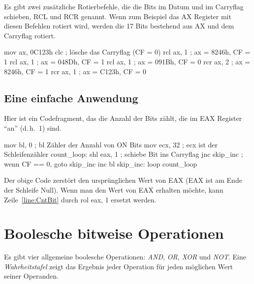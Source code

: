 Es gibt zwei zus\"{a}tzliche Rotierbefehle, die die Bits im Datum und im
Carryflag schieben, {\code RCL}  und
{\code RCR}  genannt. Wenn zum Beispiel
das {\code AX} Register mit diesen Befehlen rotiert wird, werden die
17 Bits bestehend aus {\code AX} und dem Carryflag rotiert.
\begin{AsmCodeListing}[frame=none, numbers=left, firstnumber=last, commandchars=\\\{\}]
      mov    ax, 0C123h
      clc                     ; l\"{o}sche das Carryflag (CF = 0)
      rcl    ax, 1            ; ax = 8246h, CF = 1
      rcl    ax, 1            ; ax = 048Dh, CF = 1
      rcl    ax, 1            ; ax = 091Bh, CF = 0
      rcr    ax, 2            ; ax = 8246h, CF = 1
      rcr    ax, 1            ; ax = C123h, CF = 0
\end{AsmCodeListing}

\subsection{Eine einfache Anwendung\label{sec:AddBitsExample}}

Hier ist ein Codefragment, das die Anzahl der Bits z\"{a}hlt, die im EAX
Register "`an"' (d.\,h.~1) sind.
\begin{AsmCodeListing}[numbers=left, commandchars=\\\{\}]
      mov    bl, 0          ; bl Z\"{a}hler der Anzahl von ON Bits
      mov    ecx, 32        ; ecx ist der Schleifenz\"{a}hler
 count_loop:
      shl    eax, 1         ; schiebe Bit ins Carryflag \label{line:CntBit}
      jnc    skip_inc       ; wenn CF == 0, goto skip_inc
      inc    bl
 skip_inc:
      loop   count_loop
\end{AsmCodeListing}
Der obige Code zerst\"{o}rt den urspr\"{u}nglichen Wert von {\code EAX}
({\code EAX} ist am Ende der Schleife Null). Wenn man den Wert von
{\code EAX} erhalten m\"{o}chte, kann Zeile~\ref{line:CntBit} durch
{\code rol  eax, 1} ersetzt werden.

\section{Boolesche bitweise Operationen}

Es gibt vier allgemeine boolesche Operationen: \emph{AND},
\emph{OR}, \emph{XOR} und \emph{NOT}. Eine \emph{Wahrheitstafel}
zeigt das Ergebnis jeder Operation f\"{u}r jeden m\"{o}glichen Wert seiner
Operanden.

